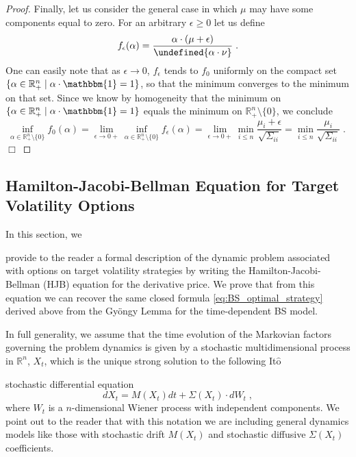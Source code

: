 \documentclass[runningheads]{m2ef}
\let\norm\undefined %
\DeclarePairedDelimiter\norm{\lVert}{\rVert}
\newcommand\soutpars[1]{\let\helpcmd\sout\parhelp#1\par\relax\relax}
\newcommand{\change}[1]{{\color{red} {#1}}}%
\newcommand{\remove}[1]{{\color{red} \soutpars{{#1}}}}%
\begin{document}
\begin{proof}
	Finally, let us consider the general case in which $\mu$ may have some components equal to zero. For an arbitrary $\epsilon \geq 0$ let us define
	\begin{equation}
	f_{\epsilon}(\alpha) = \frac{\alpha \cdot (\mu+\epsilon)}{\norm{\alpha \cdot \nu}} \; .
	\end{equation}
	One can easily note that as $\epsilon \to 0$, $f_{\epsilon}$ tends to $f_{0}$ uniformly on the compact set $\{\alpha \in \mathbb{R}^n_+ \mid \alpha \cdot \mathbbm{1} = 1\}$, so that the minimum converges to the minimum on that set. Since we know by homogeneity that the minimum on $\{\alpha \in \mathbb{R}^n_+ \mid \alpha \cdot \mathbbm{1} = 1\}$ equals the minimum on $\mathbb{R}^n_+ \setminus \{0\}$, we conclude
	\begin{equation}
	\inf_{\alpha \in \mathbb{R}_{+}^n \setminus \{0\}} f_0(\alpha) = 
	\lim_{\epsilon \to 0+} \inf_{\alpha \in \mathbb{R}_{+}^n \setminus \{0\}} f_{\epsilon}(\alpha) = 
	\lim_{\epsilon \to 0+} \min_{i\leq n} \frac{\mu_i+\epsilon}{\sqrt{\Sigma_{ii}}} =
	\min_{i\leq n} \frac{\mu_i}{\sqrt{\Sigma_{ii}}} \; . \; 
	\end{equation} $\Box$
\end{proof}


\subsection{Hamilton-Jacobi-Bellman \change{E}quation for \change{T}arget \change{V}olatility \change{O}ptions}\label{subsec:HJB}
In this section, we \remove{want to} provide to the reader a formal description of the dynamic problem associated with options on target volatility strategies by writing the Hamilton-Jacobi-Bellman (HJB) equation for the derivative price. We prove that from this equation we can recover the same closed formula \eqref{eq:BS_optimal_strategy} derived above from the Gy\"ongy Lemma for the time-dependent BS model. 

In full generality, we assume that the time evolution of the Markovian factors governing the problem dynamics is given by  a stochastic multidimensional process in $\mathbb{R}^n$, $X_t$, which is the unique strong solution to the following It$\hat{\text{o}}$ \remove{SDE} \change{stochastic differential equation} 
\begin{equation}
		dX_t = M(X_t)dt + \Sigma(X_t) \cdot dW_t \; ,
\end{equation}
where $W_t$ is a $n$-dimensional Wiener process with independent components. We point out to the reader that with this notation we are including general dynamics models like those with stochastic drift $M(X_t)$ and stochastic diffusive $\Sigma(X_t)$ coefficients. 
\end{document}
